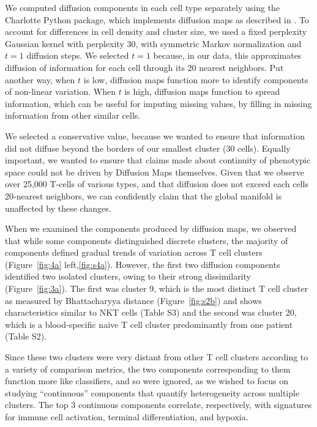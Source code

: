We computed diffusion components in each cell type separately using the Charlotte Python package, which implements diffusion maps as described in \citep{Coifman2005}.
To account for differences in cell density and cluster size, we used a fixed perplexity Gaussian kernel with perplexity 30, with symmetric Markov normalization and $t=1$ diffusion steps.
We selected $t=1$ because, in our data, this approximates diffusion of information for each cell through its 20 nearest neighbors. 
Put another way, when $t$ is low, diffusion maps function more to identify components of non-linear variation. When $t$ is high, diffusion maps function to spread information, which can be useful for imputing missing values, by filling in missing information from other similar cells. 

We selected a conservative value, because we wanted to ensure that information did not diffuse beyond the borders of our smallest cluster (30 cells).
Equally important, we wanted to ensure that claims made about continuity of phenotypic space could not be driven by Diffusion Maps themselves. 
Given that we observe over 25,000 T-cells of various types, and that diffusion does not exceed each cells 20-nearest neighbors, we can confidently claim that the global manifold is unaffected by these changes. 

When we examined the components produced by diffusion maps, we observed that while some components distinguished discrete clusters, the majority of components defined gradual trends of variation across T cell clusters (Figure~\ref{fig:4a} left,\ref{fig:s4a}).
However, the first two diffusion components identified two isolated clusters, owing to their strong dissimilarity (Figure~\ref{fig:3a}). 
The first was cluster 9, which is the most distinct T cell cluster as measured by Bhattacharyya distance (Figure~\ref{fig:s2b}) and shows characteristics similar to NKT cells (Table S3) and the second was cluster 20, which is a blood-specific naive T cell cluster predominantly from one patient (Table S2).

Since these two clusters were very distant from other T cell clusters according to a variety of comparison metrics, the two components corresponding to them function more like classifiers, and so were ignored, as we wished to focus on studying ``continuous'' components that quantify heterogeneity across multiple clusters.
The top 3 continuous components correlate, respectively, with signatures for immune cell activation, terminal differentiation, and hypoxia. %

